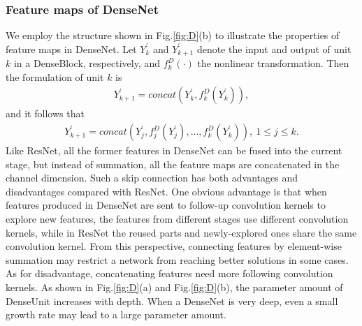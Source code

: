 \documentclass[journal]{IEEEtran}
\begin{document}
\subsubsection{Feature maps of DenseNet}

We employ the structure shown in Fig.\ref{fig:D}(b) to illustrate the properties of feature maps in DenseNet. Let $Y_{k}^{'}$ and $Y_{k+1}^{'}$ denote the input and output of unit $k$ in a DenseBlock, respectively, and $f_{k}^{D}(\cdot)$ the nonlinear transformation. Then the formulation of unit $k$ is 
\begin{equation}
\begin{split}
Y_{k+1}^{'} = concat(Y_{k}^{'}, f_{k}^{D}(Y_{k}^{'})),
\end{split}
\label{con:dense_1}
\end{equation}
and it follows that 
\begin{equation}
\begin{split}
Y_{k+1}^{'} = concat(Y_{j}^{'},f_{j}^{D}(Y_{j}^{'}),\dots,f_{k}^{D}(Y_{k}^{'})) ,~1 \leq j \leq k. 
\end{split}
\label{con:dense_2}
\end{equation}
Like ResNet, all the former features in DenseNet can be fused into the current stage, but instead of summation, all the feature maps are concatenated in the channel dimension. Such a skip connection has both advantages and disadvantages compared with ResNet. One obvious advantage is that when features produced in DenseNet are sent to follow-up convolution kernels to explore new features, the features from different stages use different convolution kernels, while in ResNet the reused parts and newly-explored ones share the same convolution kernel. From this perspective, connecting features by element-wise summation may restrict a network from reaching better solutions in some cases. As for disadvantage, concatenating features need more following convolution kernels. As shown in Fig.\ref{fig:D}(a) and Fig.\ref{fig:D}(b), the parameter amount of DenseUnit increases with depth. When a DenseNet is very deep, even a small growth rate may lead to a large parameter amount. 
\end{document}
